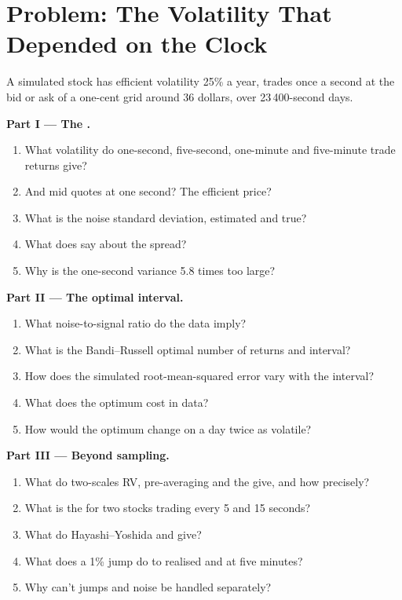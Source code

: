 \section{Problem: The Volatility That Depended on the Clock}

\begin{problem}\label{pb:qm:high-frequency-econometrics:1}
A simulated stock has efficient volatility 25\% a year, trades once a second at the bid or ask of a one-cent grid around 36 dollars, over 23\,400-second days.

\medskip\noindent\textbf{Part I --- The .}
\begin{enumerate}
\item What volatility do one-second, five-second, one-minute and five-minute trade returns give?
\item And mid quotes at one second? The efficient price?
\item What is the noise standard deviation, estimated and true?
\item What does  say about the spread?
\item Why is the one-second variance 5.8 times too large?
\end{enumerate}

\medskip\noindent\textbf{Part II --- The optimal interval.}
\begin{enumerate}[resume]
\item What noise-to-signal ratio do the data imply?
\item What is the Bandi--Russell optimal number of returns and interval?
\item How does the simulated root-mean-squared error vary with the interval?
\item What does the optimum cost in data?
\item How would the optimum change on a day twice as volatile?
\end{enumerate}

\medskip\noindent\textbf{Part III --- Beyond sampling.}
\begin{enumerate}[resume]
\item What do two-scales RV, pre-averaging and the  give, and how precisely?
\item What is the  for two stocks trading every 5 and 15 seconds?
\item What do Hayashi--Yoshida and  give?
\item What does a 1\% jump do to realised and  at five minutes?
\item Why can't jumps and noise be handled separately?
\end{enumerate}


\end{problem}
